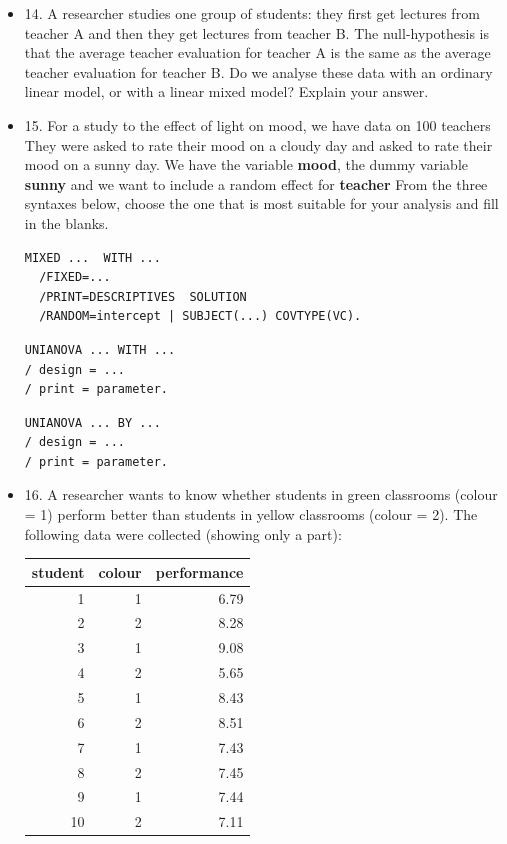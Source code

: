 \documentclass[]{report}\usepackage[]{graphicx}\usepackage[]{color}
\newenvironment{knitrout}{}{} %
\begin{document}
\begin{itemize}
\item 14. A researcher studies one group of students: they first get lectures from teacher A and then they get lectures from teacher B. The null-hypothesis is that the average teacher evaluation for teacher A is the same as the average teacher evaluation for teacher B. Do we analyse these data with an ordinary linear model, or with a linear mixed model? Explain your answer. 


\item 15. For a study to the effect of light on mood, we have data on 100 teachers They were asked to rate their mood on a cloudy day and asked to rate their mood on a sunny day. We have the variable \textbf{mood}, the dummy variable \textbf{sunny} and we want to include a random effect for \textbf{teacher} From the three syntaxes below, choose the one that is most suitable for your analysis and fill in the blanks.


\begin{verbatim}
MIXED ...  WITH ...
  /FIXED=...
  /PRINT=DESCRIPTIVES  SOLUTION
  /RANDOM=intercept | SUBJECT(...) COVTYPE(VC).
\end{verbatim}


\begin{verbatim}
UNIANOVA ... WITH ... 
/ design = ...
/ print = parameter.
\end{verbatim}


\begin{verbatim}
UNIANOVA ... BY ... 
/ design = ...
/ print = parameter.
\end{verbatim}


\item 16. A researcher wants to know whether students in green classrooms (colour = 1) perform better than students in yellow classrooms (colour = 2). The following data were collected (showing only a part):

\begin{knitrout}
\color{fgcolor}
\begin{tabular}{r|r|r}
\hline
student & colour & performance\\
\hline
1 & 1 & 6.79\\
\hline
2 & 2 & 8.28\\
\hline
3 & 1 & 9.08\\
\hline
4 & 2 & 5.65\\
\hline
5 & 1 & 8.43\\
\hline
6 & 2 & 8.51\\
\hline
7 & 1 & 7.43\\
\hline
8 & 2 & 7.45\\
\hline
9 & 1 & 7.44\\
\hline
10 & 2 & 7.11\\
\hline
\end{tabular}



\end{knitrout}
\end{itemize}
\end{document}
